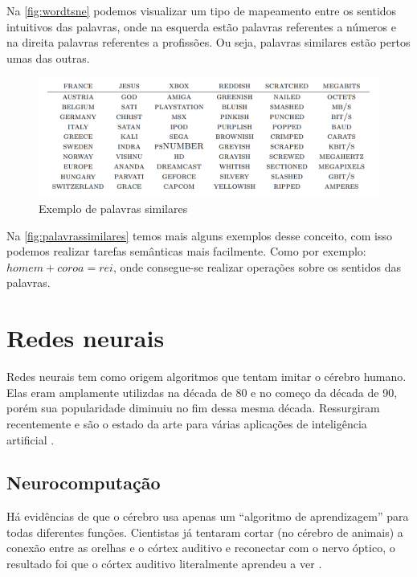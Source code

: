 Na \autoref{fig:wordtsne} podemos visualizar um tipo de mapeamento entre os sentidos intuitivos das palavras, onde na esquerda estão palavras referentes a números e na direita palavras referentes a profissões. Ou seja, palavras similares estão pertos umas das outras.

\begin{figure}[htb]
  \caption{Exemplo de palavras similares}\label{fig:palavrassimilares}
  \begin{center}
      \includegraphics[scale=0.35]{img/Colbert-WordTable2}
  \end{center}
\end{figure}

Na \autoref{fig:palavrassimilares} temos mais alguns exemplos desse conceito, com isso podemos realizar tarefas semânticas mais facilmente. Como por exemplo: $homem + coroa = rei$, onde consegue-se realizar operações sobre os sentidos das palavras.



\section{Redes neurais}\label{sec:redesneurais}

Redes neurais tem como origem algoritmos que tentam imitar o cérebro humano. Elas eram amplamente utilizdas na década de 80 e no começo da década de 90, porém sua popularidade diminuiu no fim dessa mesma década. Ressurgiram recentemente e são o estado da arte para várias aplicações de inteligência artificial \cite{machinelearningcoursera}.

\subsection{Neurocomputação}

Há evidências de que o cérebro usa apenas um ``algoritmo de aprendizagem'' para todas diferentes funções. Cientistas já tentaram cortar (no cérebro de animais) a conexão entre as orelhas e o córtex auditivo e reconectar com o nervo óptico, o resultado foi que o córtex auditivo literalmente aprendeu a ver \cite{machinelearningcoursera}. 

